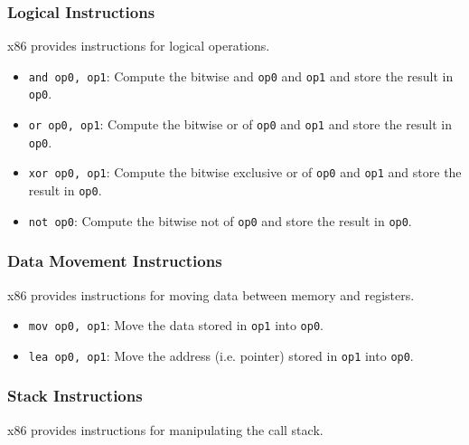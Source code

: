 \subsubsection{Logical Instructions}
x86 provides instructions for logical operations.

\begin{itemize}
    \item \texttt{and op0, op1}: Compute the bitwise and \texttt{op0} and \texttt{op1} and store the result in \texttt{op0}.
    \item \texttt{or op0, op1}: Compute the bitwise or of \texttt{op0} and \texttt{op1} and store the result in \texttt{op0}.
    \item \texttt{xor op0, op1}: Compute the bitwise exclusive or of \texttt{op0} and \texttt{op1} and store the result in \texttt{op0}.
    \item \texttt{not op0}: Compute the bitwise not of \texttt{op0} and store the result in \texttt{op0}.
\end{itemize}

\subsubsection{Data Movement Instructions}
x86 provides instructions for moving data between memory and registers.

\begin{itemize}
    \item \texttt{mov op0, op1}: Move the data stored in \texttt{op1} into \texttt{op0}.
    \item \texttt{lea op0, op1}: Move the address (i.e. pointer) stored in \texttt{op1} into \texttt{op0}.
\end{itemize}

\subsubsection{Stack Instructions}
x86 provides instructions for manipulating the call stack.

